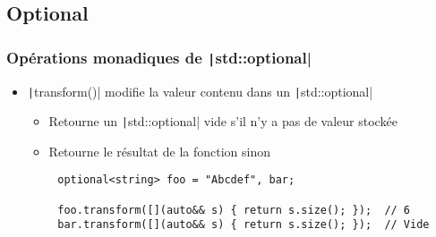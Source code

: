 \documentclass[C++.tex]{subfiles}
\begin{document}
\subsection*{Optional}
\begin{frame}[fragile]
	\frametitle{Opérations monadiques de \texttt|std::optional|}
	\begin{itemize}
		\item \texttt|transform()| modifie la valeur contenu dans un \texttt|std::optional|


		\begin{itemize}
			\item Retourne un \texttt|std::optional| vide s'il n'y a pas de valeur stockée
			\item Retourne le résultat de la fonction sinon
		\end{itemize}
	\end{itemize}

	\begin{verbatim}
		optional<string> foo = "Abcdef", bar;

		foo.transform([](auto&& s) { return s.size(); });  // 6
		bar.transform([](auto&& s) { return s.size(); });  // Vide
	\end{verbatim}


\end{frame}
\end{document}
